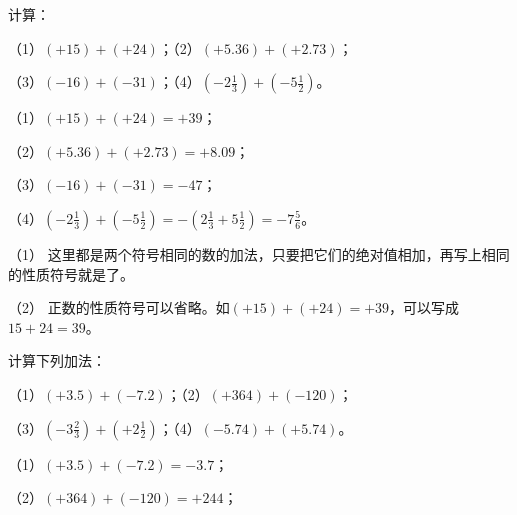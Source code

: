 \begin{center}
\end{center}

 计算：

（1）\((+15) + (+24)\)；\qquad （2）\((+5.36) + (+2.73)\)；

（3）\((-16) + (-31)\)；\qquad （4）\(\left(-2\frac{1}{3}\right) + \left(-5\frac{1}{2}\right)\)。

 （1）\((+15) + (+24) = +39\)；

（2）\((+5.36) + (+2.73) = +8.09\)；

（3）\((-16) + (-31) = -47\)；

（4）\(\left(-2\frac{1}{3}\right) + \left(-5\frac{1}{2}\right) = -\left(2\frac{1}{3} + 5\frac{1}{2}\right) = -7\frac{5}{6}\)。

 （1） 这里都是两个符号相同的数的加法，只要把它们的绝对值相加，再写上相同的性质符号就是了。

（2） 正数的性质符号可以省略。如\((+15)+(+24)=+39\)，可以写成\(15+24=39\)。

 计算下列加法：

（1）\((+3.5) + (-7.2)\)；\qquad （2）\((+364) + (-120)\)；

（3）\(\left(-3\frac{2}{3}\right) + \left(+2\frac{1}{2}\right)\)；\qquad （4）\((-5.74) + (+5.74)\)。

 （1）\((+3.5) + (-7.2) = -3.7\)；

（2）\((+364) + (-120) = +244\)；


